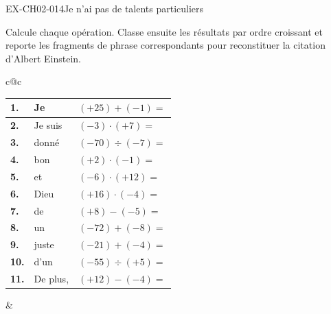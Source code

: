 \documentclass[12pt, a4paper]{article}
\begin{document}
\begin{exercice}{EX-CH02-014}{Je n'ai pas de talents particuliers}

Calcule chaque opération. Classe ensuite les résultats par ordre croissant et reporte les fragments de phrase correspondants pour reconstituer la citation
d'Albert Einstein.

\def\arraystretch{1.25}
\setlength{\tabcolsep}{4pt}
\vspace{2mm}

\begin{center}
\begin{tabular}{c@{\hspace{8mm}}c}

  \begin{tabular}{|>{\centering\arraybackslash}p{6mm}|p{3.5cm}|p{3cm}|}
    \hline
    \cellcolor{gray!40}\textbf{1.}  &Je& $(+25)+(-1)=$               \\ \hline
    \cellcolor{gray!40}\textbf{2.}  &Je suis& $(-3)\cdot(+7)=$              \\ \hline
    \cellcolor{gray!40}\textbf{3.}  &donné& $(-70)\div(-7)=$              \\ \hline
    \cellcolor{gray!40}\textbf{4.}  &bon& $(+2)\cdot(-1)=$               \\ \hline
    \cellcolor{gray!40}\textbf{5.}  &et& $(-6)\cdot(+12)=$             \\ \hline
    \cellcolor{gray!40}\textbf{6.}  &Dieu& $(+16)\cdot(-4)=$             \\ \hline
    \cellcolor{gray!40}\textbf{7.}  &de& $(+8)-(-5)=$        \\ \hline
    \cellcolor{gray!40}\textbf{8.}  &un& $(-72)+(-8)=$                 \\ \hline
    \cellcolor{gray!40}\textbf{9.}  &juste& $(-21)+(-4)=$                 \\ \hline
    \cellcolor{gray!40}\textbf{10.} &d'un& $(-55)\div(+5)=$              \\ \hline
    \cellcolor{gray!40}\textbf{11.} &De plus,& $(+12)-(-4)=$      \\ \hline
  \end{tabular}

  &


\end{tabular}
\end{center}
\end{exercice}
\end{document}
